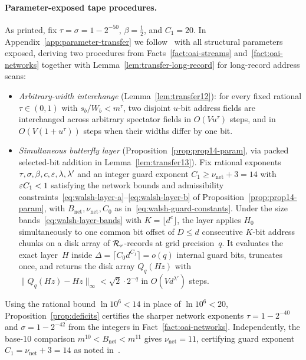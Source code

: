 \paragraph{Parameter-exposed tape procedures.}
As printed, \cite[Lemma~12 and Prop.~14]{OAI26} fix $\tau=\sigma=1-2^{-50}$, $\beta=\tfrac12$, and $C_1=20$. In Appendix~\ref{app:parameter-transfer} we follow~\cite[\S\S4--5]{OAI26} with all structural parameters exposed, deriving two procedures from Facts~\ref{fact:oai-streams} and~\ref{fact:oai-networks} together with Lemma~\ref{lem:transfer-long-record} for long-record address scans:
\begin{itemize}[nosep,leftmargin=*]
  \item \emph{Arbitrary-width interchange} (Lemma~\ref{lem:transfer12}): for every fixed rational $\tau\in(0,1)$ with $s_b/W_b<m^\tau$, two disjoint $u$-bit address fields are interchanged across arbitrary spectator fields in $O(V u^\tau)$ steps, and in $O(V(1+u^\tau))$ steps when their widths differ by one bit.

  \item \emph{Simultaneous butterfly layer} (Proposition~\ref{prop:prop14-param}, via packed selected-bit addition in Lemma~\ref{lem:transfer13}). Fix rational exponents $\tau,\sigma,\beta,c,\varepsilon,\lambda,\lambda'$ and an integer guard exponent $C_1\ge\nu_{\mathrm{net}}+3=14$ with $\varepsilon C_1<1$ satisfying the network bounds and admissibility constraints~\eqref{eq:walsh-layer-a}--\eqref{eq:walsh-layer-b} of Proposition~\ref{prop:prop14-param}, with $B_{\mathrm{net}},\nu_{\mathrm{net}},C_0$ as in~\eqref{eq:walsh-guard-constants}. Under the size bands~\eqref{eq:walsh-layer-bands} with $K=\lfloor d^c\rfloor$, the layer applies $H_0$ simultaneously to one common bit offset of $D\le d$ consecutive $K$-bit address chunks on a disk array of $\mathcal{R}_r$-records at grid precision~$q$. It evaluates the exact layer~$H$ inside $\Delta=\lceil C_0 d^{C_1}\rceil=o(q)$ internal guard bits, truncates once, and returns the disk array $Q_q(Hz)$ with $\|Q_q(Hz)-Hz\|_\infty<\sqrt2\cdot 2^{-q}$ in $O(V d^{\lambda'})$ steps.
\end{itemize}
Using the rational bound $\ln 10^6<14$ in place of $\ln 10^6<20$, Proposition~\ref{prop:deficits} certifies the sharper network exponents $\tau=1-2^{-40}$ and $\sigma=1-2^{-42}$ from the integers in Fact~\ref{fact:oai-networks}. Independently, the base-$10$ comparison $m^{10}<B_{\mathrm{net}}<m^{11}$ gives $\nu_{\mathrm{net}}=11$, certifying guard exponent $C_1=\nu_{\mathrm{net}}+3=14$ as noted in~\cite[\S5.4]{OAI26}.
